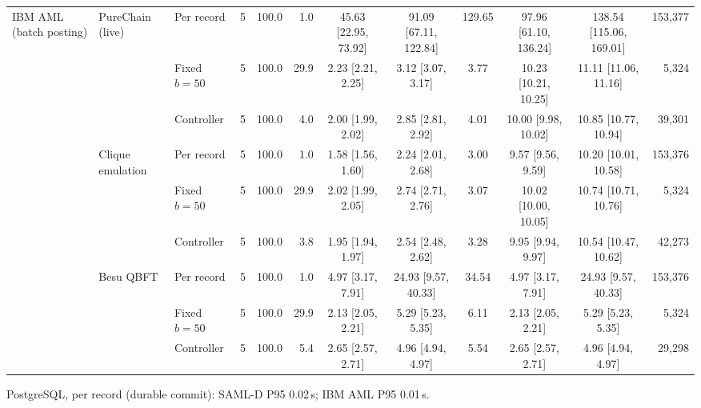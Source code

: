 \begin{table}[t]
\begin{adjustbox}{max width=\textwidth}
\begin{tabular}{lllrrrcccccr}
IBM AML (batch posting) & PureChain (live) & Per record & 5 & 100.0 & 1.0 & 45.63 [22.95, 73.92] & 91.09 [67.11, 122.84] & 129.65 & 97.96 [61.10, 136.24] & 138.54 [115.06, 169.01] & 153,377 \\
 &  & Fixed $b{=}50$ & 5 & 100.0 & 29.9 & 2.23 [2.21, 2.25] & 3.12 [3.07, 3.17] & 3.77 & 10.23 [10.21, 10.25] & 11.11 [11.06, 11.16] & 5,324 \\
 &  & Controller & 5 & 100.0 & 4.0 & 2.00 [1.99, 2.02] & 2.85 [2.81, 2.92] & 4.01 & 10.00 [9.98, 10.02] & 10.85 [10.77, 10.94] & 39,301 \\
 & Clique emulation & Per record & 5 & 100.0 & 1.0 & 1.58 [1.56, 1.60] & 2.24 [2.01, 2.68] & 3.00 & 9.57 [9.56, 9.59] & 10.20 [10.01, 10.58] & 153,376 \\
 &  & Fixed $b{=}50$ & 5 & 100.0 & 29.9 & 2.02 [1.99, 2.05] & 2.74 [2.71, 2.76] & 3.07 & 10.02 [10.00, 10.05] & 10.74 [10.71, 10.76] & 5,324 \\
 &  & Controller & 5 & 100.0 & 3.8 & 1.95 [1.94, 1.97] & 2.54 [2.48, 2.62] & 3.28 & 9.95 [9.94, 9.97] & 10.54 [10.47, 10.62] & 42,273 \\
 & Besu QBFT & Per record & 5 & 100.0 & 1.0 & 4.97 [3.17, 7.91] & 24.93 [9.57, 40.33] & 34.54 & 4.97 [3.17, 7.91] & 24.93 [9.57, 40.33] & 153,376 \\
 &  & Fixed $b{=}50$ & 5 & 100.0 & 29.9 & 2.13 [2.05, 2.21] & 5.29 [5.23, 5.35] & 6.11 & 2.13 [2.05, 2.21] & 5.29 [5.23, 5.35] & 5,324 \\
 &  & Controller & 5 & 100.0 & 5.4 & 2.65 [2.57, 2.71] & 4.96 [4.94, 4.97] & 5.54 & 2.65 [2.57, 2.71] & 4.96 [4.94, 4.97] & 29,298 \\
\bottomrule
\end{tabular}\end{adjustbox}
\par\smallskip\footnotesize PostgreSQL, per record (durable commit): SAML-D P95 0.02\,s; IBM AML P95 0.01\,s.
\end{table}
